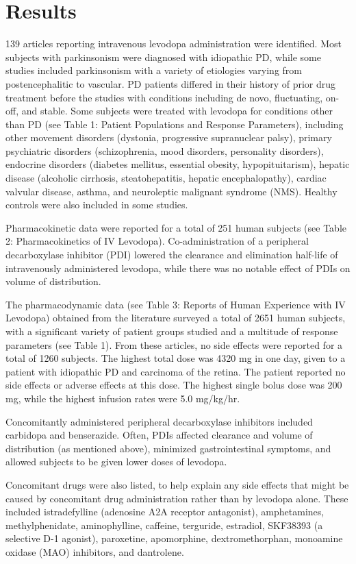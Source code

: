 \section{Results}
139 articles reporting intravenous levodopa administration were identified.  Most subjects with parkinsonism were diagnosed with idiopathic PD, while some studies included parkinsonism with a variety of etiologies varying from postencephalitic to vascular.  PD patients differed in their history of prior drug treatment before the studies with conditions including de novo, fluctuating, on-off, and stable.  Some subjects were treated with levodopa for conditions other than PD (see Table 1: Patient Populations and Response Parameters), including other movement disorders (dystonia, progressive supranuclear palsy), primary psychiatric disorders (schizophrenia, mood disorders, personality disorders),  endocrine disorders (diabetes mellitus, essential obesity, hypopituitarism), hepatic disease (alcoholic cirrhosis, steatohepatitis, hepatic encephalopathy), cardiac valvular disease, asthma, and neuroleptic malignant syndrome (NMS).  Healthy controls were also included in some studies.

Pharmacokinetic data were reported for a total of 251 human subjects (see Table 2: Pharmacokinetics of IV Levodopa).  Co-administration of a peripheral decarboxylase inhibitor (PDI) lowered the clearance and elimination half-life of intravenously administered levodopa, while there was no notable effect of PDIs on volume of distribution.

The pharmacodynamic data (see Table 3: Reports of Human Experience with IV Levodopa) obtained from the literature  surveyed a total of 2651 human subjects, with a significant variety of patient groups studied and a multitude of response parameters (see Table 1).  From these articles, no side effects were reported for a total of 1260 subjects.  The highest total dose was 4320 mg in one day, given to a patient with idiopathic PD and carcinoma of the retina.  The patient reported no side effects or adverse effects at this dose.  The highest single bolus dose was 200 mg, while the highest infusion rates were 5.0 mg/kg/hr.

Concomitantly administered peripheral decarboxylase inhibitors included carbidopa and benserazide.  Often, PDIs affected clearance and volume of distribution (as mentioned above), minimized gastrointestinal symptoms, and allowed subjects to be given lower doses of levodopa.    

Concomitant drugs were also listed, to help explain any side effects that might be caused by concomitant drug administration rather than by levodopa alone.  These included istradefylline (adenosine A2A receptor antagonist), amphetamines, methylphenidate, aminophylline, caffeine, terguride, estradiol, SKF38393 (a selective D-1 agonist), paroxetine, apomorphine, dextromethorphan, monoamine oxidase (MAO) inhibitors, and dantrolene.  

